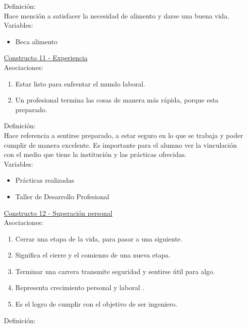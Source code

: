 Definición:\\

Hace mención a satisfacer la necesidad de alimento y darse una buena vida.\\

Variables:\\
\begin{itemize}
	\item Beca alimento	
\end{itemize} 

\underline {Constructo 11 - Experiencia} \\
Asociaciones:
\begin{enumerate}
	\item Estar listo para enfrentar el mundo laboral.
	\item Un profesional termina las cosas de manera más rápida, porque esta preparado.	
\end{enumerate}

Definición:\\

Hace referencia a sentirse preparado, a estar seguro en lo que se trabaja y poder cumplir de manera excelente. Es importante para el alumno ver la vinculación con el medio que tiene la institución y las prácticas ofrecidas.\\

Variables:\\
\begin{itemize}
	\item Prácticas realizadas
	\item Taller de Desarrollo Profesional	
\end{itemize} 

\underline {Constructo 12 - Superación personal} \\
Asociaciones:
\begin{enumerate}
	\item Cerrar una etapa de la vida, para pasar a una siguiente.
	\item Significa el cierre y el comienzo de una nueva etapa.
	\item Terminar una carrera transmite seguridad y sentirse útil para algo.
	\item Representa crecimiento personal y laboral	.
	\item Es el logro de cumplir con el objetivo de ser ingeniero.
\end{enumerate}

Definición:\\

